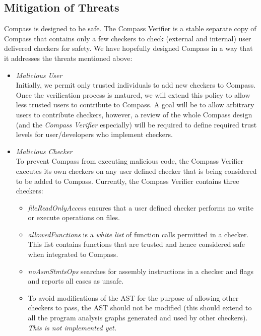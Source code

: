 \subsection{Mitigation of Threats}

Compass is designed to be safe. The Compass Verifier is a stable separate copy of Compass
that contains only a few checkers to check (external and internal) user delivered checkers
for safety.  We have hopefully designed Compass in a way that it addresses the threats
mentioned above:
\begin{itemize}
\item \emph{Malicious User} \\ Initially, we permit only trusted individuals to add new
    checkers to Compass. Once the verification process is matured, we will extend this
    policy to allow less trusted users to contribute to Compass. A goal will be to allow
    arbitrary users to contribute checkers, however, a review of the whole Compass design
    (and the {\em Compass Verifier} especially) will be required to define required trust
    levels for user/developers who implement checkers.

\item \emph{Malicious Checker} \\ To prevent Compass from executing malicious code, the Compass
    Verifier executes its own checkers on any user defined checker that is being
    considered to be added to Compass. Currently, the Compass Verifier contains three checkers:
   \begin{itemize}
      \item \emph{fileReadOnlyAccess} ensures that a user defined checker performs no write
         or execute operations on files.
      \item \emph{allowedFunctions} is a {\em white list} of function calls permitted in
         a checker. This list contains functions that are trusted and hence considered
         safe when integrated to Compass.
      \item \emph{noAsmStmtsOps} searches for assembly instructions in a checker and flags
         and reports all cases as unsafe.
      \item To avoid modifications of the AST for the purpose of allowing other checkers
         to pass, the AST should not be modified (this should extend to all the
         program analysis graphs generated and used by other checkers).
         {\em This is not implemented yet.} 
\end{itemize}


\end{itemize}
